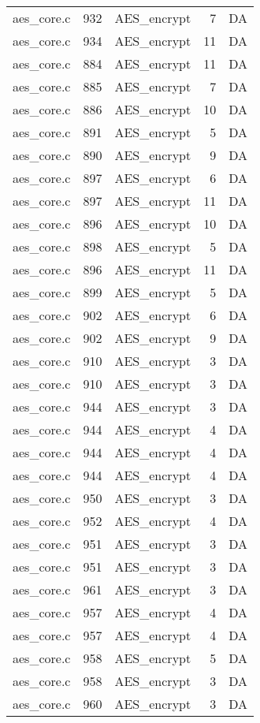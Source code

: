 \begin{table}[h]
{\begin{tabular}{clrrr}
aes\_core.c&932&AES\_encrypt&7 &DA\\
aes\_core.c&934&AES\_encrypt&11&DA\\
aes\_core.c&884&AES\_encrypt&11&DA\\
aes\_core.c&885&AES\_encrypt&7 &DA\\
aes\_core.c&886&AES\_encrypt&10&DA\\
aes\_core.c&891&AES\_encrypt&5 &DA\\
aes\_core.c&890&AES\_encrypt&9 &DA\\
aes\_core.c&897&AES\_encrypt&6 &DA\\
aes\_core.c&897&AES\_encrypt&11&DA\\
aes\_core.c&896&AES\_encrypt&10&DA\\
aes\_core.c&898&AES\_encrypt&5 &DA\\
aes\_core.c&896&AES\_encrypt&11&DA\\
aes\_core.c&899&AES\_encrypt&5 &DA\\
aes\_core.c&902&AES\_encrypt&6 &DA\\
aes\_core.c&902&AES\_encrypt&9 &DA\\
aes\_core.c&910&AES\_encrypt&3 &DA\\
aes\_core.c&910&AES\_encrypt&3 &DA\\
aes\_core.c&944&AES\_encrypt&3 &DA\\
aes\_core.c&944&AES\_encrypt&4 &DA\\
aes\_core.c&944&AES\_encrypt&4 &DA\\
aes\_core.c&944&AES\_encrypt&4 &DA\\
aes\_core.c&950&AES\_encrypt&3 &DA\\
aes\_core.c&952&AES\_encrypt&4 &DA\\
aes\_core.c&951&AES\_encrypt&3 &DA\\
aes\_core.c&951&AES\_encrypt&3 &DA\\
aes\_core.c&961&AES\_encrypt&3 &DA\\
aes\_core.c&957&AES\_encrypt&4 &DA\\
aes\_core.c&957&AES\_encrypt&4 &DA\\
aes\_core.c&958&AES\_encrypt&5 &DA\\
aes\_core.c&958&AES\_encrypt&3 &DA\\
aes\_core.c&960&AES\_encrypt&3 &DA\\
\hline
\end{tabular}
}
\end{table}